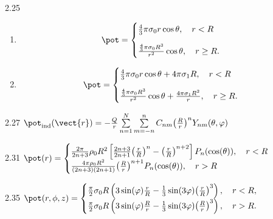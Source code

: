 \begin{Solution}{2.{25}}
	\begin{enumerate}[label=\alph*)]
		\item%
		      \begin{equation}
			      \pot = \begin{cases}
				      \frac43\pi\sigma_0r \cos\theta, \quad r<R \\[1em]
				      \frac{\frac43\pi\sigma_0R^3}{r^2} \cos\theta, \quad r \ge R.
			      \end{cases}
		      \end{equation}
		\item%
		      \begin{equation}
			      \pot = \begin{cases}
				      \frac43\pi\sigma_0r \cos\theta + 4\pi\sigma_1 R, \quad r<R \\[1em]
				      \frac{\frac43\pi\sigma_0R^3}{r^2} \cos\theta + \frac{4\pi\sigma_1 R^2}{r}, \quad r \ge R.
			      \end{cases}
		      \end{equation}
	\end{enumerate}
\end{Solution}
\begin{Solution}{2.{27}}
	$\pot_\text{ind}(\vect{r}) =  - \frac{Q}{r}\sum\limits_{n = 1}^N \sum\limits_{m =  - n}^n {C_{nm}{\left( \frac{R}{r} \right)^n}} Y_{nm}(\theta ,\varphi )$
\end{Solution}
\begin{Solution}{2.{31}}
	$\pot (r) =
		\begin{cases}
			\frac{{2\pi }}{{2n + 3}}{\rho _0}{R^2}\left[ {\frac{{2n + 3}}{{2n + 1}}{{\left( {\frac{r}{R}} \right)}^n} - {{\left( {\frac{r}{R}} \right)}^{n + 2}}} \right]{P_n}(\cos (\theta )) , \quad r<R \\
			\frac{{4\pi {\rho _0}{R^2}}}{{(2n + 3)(2n + 1)}}{\left( {\frac{R}{r}} \right)^{n + 1}}{P_n}(\cos (\theta )) , \quad r>R
		\end{cases}$
\end{Solution}
\begin{Solution}{2.{35}}
	$
		\pot(r, \phi, z) =
		\begin{cases}
			\frac{\pi }{2}{\sigma _0}R\left( {3\sin (\varphi )\frac{r}{R} - \frac{1}{3}\sin (3\varphi ){{\left( {\frac{r}{R}} \right)}^3}} \right), \quad r < R , \\
			\frac{\pi }{2}{\sigma _0}R\left( {3\sin (\varphi )\frac{R}{r} - \frac{1}{3}\sin (3\varphi ){{\left( {\frac{R}{r}} \right)}^3}} \right) , \quad r > R .
		\end{cases}
	$
\end{Solution}
